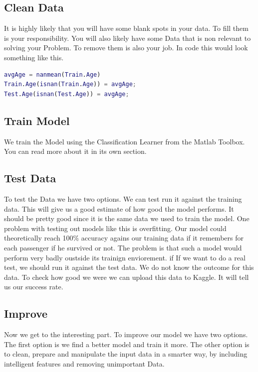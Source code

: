 \documentclass[
   10.5pt,
   invert-title=true,
   titlepage=false,
   titleimage-ratio=13,
   class=article
]{bfhpub}				%
\begin{document}
\subsection*{Clean Data}
It is highly likely that you will have some blank spots in your data. To fill them is your responsibility. You will also likely have some Data that is non relevant to solving your Problem. To remove them is also your job. In code this would look something like this.

\begin{lstlisting}[language=Matlab]
avgAge = nanmean(Train.Age)          
Train.Age(isnan(Train.Age)) = avgAge;  
Test.Age(isnan(Test.Age)) = avgAge;    
\end{lstlisting}

\subsection*{Train Model}
We train the Model using the Classification Learner from the Matlab Toolbox. You can read more about it in its own section. 
 
\subsection*{Test Data}
To test the Data we have two options. We can test run it against the training data. This will give us a good estimate of how good the model performs. It should be pretty good since it is the same data we used to train the model. One problem with testing out models like this is overfitting. Our model could theoretically reach 100\% accuracy agains our training data if it remembers for each passenger if he survived or not. The problem is that such a model would perform very badly oustside its trainign enviorement. if If we want to do a real test, we should run it against the test data. We do not know the outcome for this data. To check how good we were we can upload this data to Kaggle. It will tell us our success rate. 

\subsection*{Improve}
Now we get to the interesting part. To improve our model we have two options. The first option is we find a better model and train it more. The other option is to clean, prepare and manipulate the input data in a smarter way, by including intelligent features and removing unimportant Data.
\end{document}

